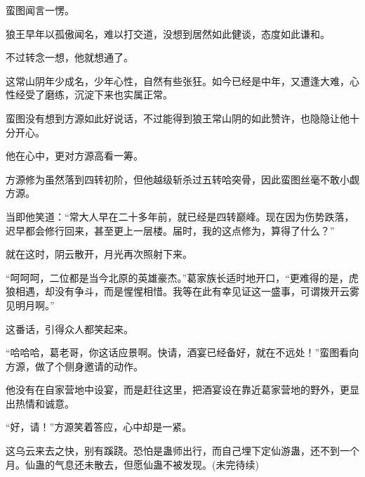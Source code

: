 \begin{this_body}
蛮图闻言一愣。

狼王早年以孤傲闻名，难以打交道，没想到居然如此健谈，态度如此谦和。

不过转念一想，他就想通了。

这常山阴年少成名，少年心性，自然有些张狂。如今已经是中年，又遭逢大难，心性经受了磨练，沉淀下来也实属正常。

蛮图没有想到方源如此好说话，不过能得到狼王常山阴的如此赞许，也隐隐让他十分开心。

他在心中，更对方源高看一筹。

方源修为虽然落到四转初阶，但他越级斩杀过五转哈突骨，因此蛮图丝毫不敢小觑方源。

当即他笑道：“常大人早在二十多年前，就已经是四转巅峰。现在因为伤势跌落，迟早都会修行回来，甚至更上一层楼。届时，我的这点修为，算得了什么？”

就在这时，阴云散开，月光再次照射下来。

“呵呵呵，二位都是当今北原的英雄豪杰。”葛家族长适时地开口，“更难得的是，虎狼相遇，却没有争斗，而是惺惺相惜。我等在此有幸见证这一盛事，可谓拨开云雾见明月啊。”

这番话，引得众人都笑起来。

“哈哈哈，葛老哥，你这话应景啊。快请，酒宴已经备好，就在不远处！”蛮图看向方源，做了个侧身邀请的动作。

他没有在自家营地中设宴，而是赶往这里，把酒宴设在靠近葛家营地的野外，更显出热情和诚意。

“好，请！”方源笑着答应，心中却是一紧。

这乌云来去之快，别有蹊跷。恐怕是蛊师出行，而自己埋下定仙游蛊，还不到一个月。仙蛊的气息还未散去，但愿仙蛊不被发现。(未完待续)

\end{this_body}

